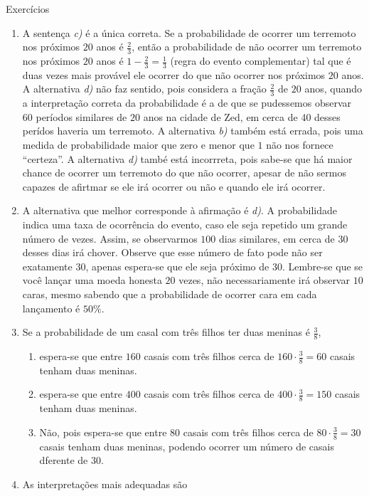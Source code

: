 \begin{answer}{Exercícios}
{\exerciselist
\begin{enumerate}
\item A sentença \textit{c)} é a única correta. Se a probabilidade de ocorrer um terremoto nos próximos $20$ anos é $\frac{2}{3}$, então a probabilidade de não ocorrer um terremoto nos próximos $20$ anos é $1-\frac{2}{3}=\frac{1}{3}$ (regra do evento complementar) tal que é duas vezes mais provável ele ocorrer do que não ocorrer nos próximos $20$ anos. A alternativa \textit{d)} não faz sentido, pois considera a fração $\frac{2}{3}$ de $20$ anos, quando a interpretação correta da probabilidade é a de que se pudessemos observar 60 períodos similares de $20$ anos na cidade de Zed, em cerca de 40 desses perídos haveria um terremoto. A alternativa \textit{b)} também está errada, pois uma medida de probabilidade maior que zero e menor que $1$ não nos fornece “certeza”. A alternativa \textit{d)} també está incorrreta, pois sabe-se que há maior chance de ocorrer um terremoto do que não ocorrer, apesar de não sermos capazes de afirtmar se ele irá ocorrer ou não e quando ele irá ocorrer.

\item A alternativa que melhor corresponde à afirmação é \textit{d)}. A probabilidade indica uma taxa de ocorrência do evento, caso ele seja repetido um grande número de vezes. Assim, se observarmos $100$ dias similares, em cerca de $30$ desses dias irá chover. Observe que esse número de fato pode não ser exatamente $30$, apenas espera-se que ele seja próximo de $30$. Lembre-se que se você lançar uma moeda honesta $20$ vezes, não necessariamente irá observar $10$ caras, mesmo sabendo que a probabilidade de ocorrer cara em cada lançamento é $50\%$.

\item Se a probabilidade de um casal com três filhos ter duas meninas é $\frac{3}{8}$,
\begin{enumerate}
\item espera-se que entre $160$ casais com três filhos cerca de $160\cdot\frac{3}{8}=60$ casais tenham duas meninas.

\item espera-se que entre $400$ casais com três filhos cerca de $400\cdot\frac{3}{8}=150$ casais tenham duas meninas.

\item Não, pois espera-se que entre $80$ casais com três filhos cerca de $80\cdot\frac{3}{8}=30$ casais tenham duas meninas, podendo ocorrer um número de casais dferente de $30$.
\end{enumerate}
\item As interpretações mais adequadas são


\end{enumerate}}
\end{answer}
